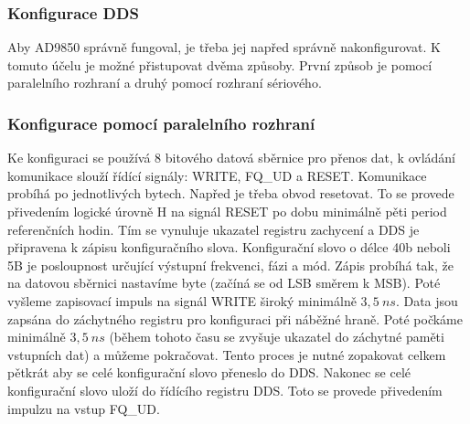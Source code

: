 \subsubsection{Konfigurace DDS}
\indent\indent Aby AD9850 správně fungoval, je třeba jej napřed správně nakonfigurovat. K tomuto účelu je možné přistupovat dvěma způsoby. První způsob je pomocí paralelního rozhraní a druhý pomocí rozhraní sériového.
  		
\subsubsection{Konfigurace pomocí paralelního rozhraní}
\indent\indent Ke konfiguraci se používá 8 bitového datová sběrnice pro přenos dat, k ovládání komunikace slouží řídící signály: WRITE, FQ\_UD a RESET. Komunikace probíhá po jednotlivých bytech. Napřed je třeba obvod resetovat. To se provede přivedením logické úrovně H na signál RESET po dobu minimálně pěti period referenčních hodin. Tím se vynuluje ukazatel registru zachycení a DDS je připravena k zápisu konfiguračního slova. Konfigurační slovo o délce 40b neboli 5B je posloupnost určující výstupní frekvenci,  fázi a mód. Zápis probíhá tak, že na datovou sběrnici nastavíme byte (začíná se od LSB směrem k MSB). Poté vyšleme zapisovací impuls na signál WRITE široký minimálně $3,5~ns$. Data jsou zapsána do záchytného registru pro konfiguraci při náběžné hraně. Poté počkáme minimálně $3,5~ns$ (během tohoto času se zvyšuje ukazatel do záchytné paměti vstupních dat) a můžeme pokračovat. Tento proces je nutné zopakovat celkem pětkrát aby se celé konfigurační slovo přeneslo do DDS. Nakonec se celé konfigurační slovo uloží do řídícího registru DDS. Toto se provede přivedením impulzu na vstup FQ\_UD.
  			
